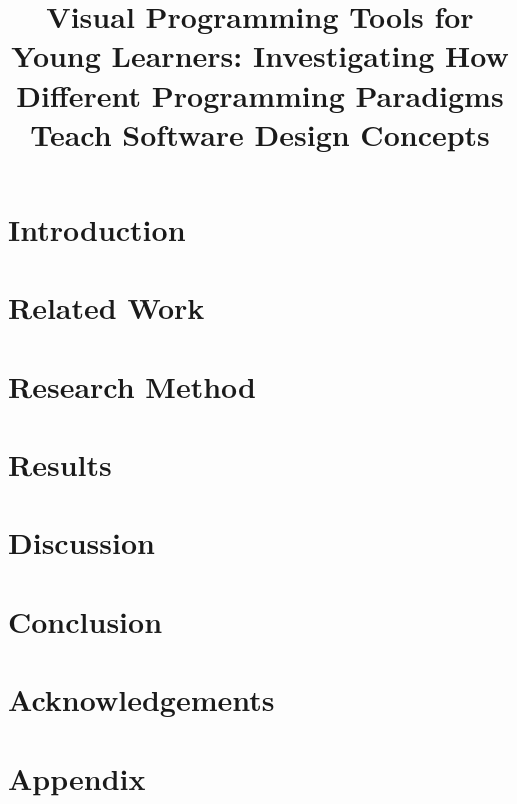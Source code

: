 \documentclass[conference]{IEEEtran}
\begin{document}
\title{Visual Programming Tools for Young Learners: Investigating How Different Programming Paradigms Teach Software Design Concepts\\}

\author{


\vspace{0.5em}

}

\maketitle
\pagestyle{plain}

\begin{abstract}
	
\end{abstract}


\section{Introduction}



\section{Related Work}



\section{Research Method}
\label{chap:method}



\section{Results}



\section{Discussion}



\section{Conclusion}


\section{Acknowledgements}




\section{Appendix}

\end{document}
